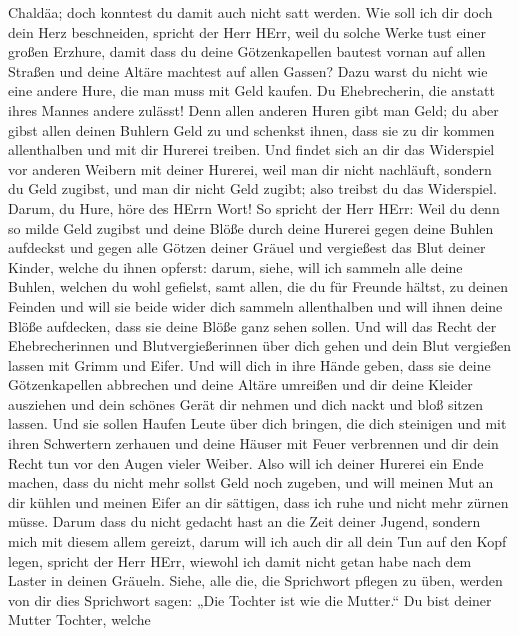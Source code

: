 Chaldäa; doch konntest du damit auch nicht satt werden. 
Wie soll ich dir doch dein Herz beschneiden, spricht der Herr HErr, weil
du solche Werke tust einer großen Erzhure,  damit dass du
deine Götzenkapellen bautest vornan auf allen Straßen und deine Altäre
machtest auf allen Gassen? Dazu warst du nicht wie eine andere Hure, die
man muss mit Geld kaufen.  Du Ehebrecherin, die anstatt
ihres Mannes andere zulässt!  Denn allen anderen Huren gibt
man Geld; du aber gibst allen deinen Buhlern Geld zu und schenkst ihnen,
dass sie zu dir kommen allenthalben und mit dir Hurerei treiben.
 Und findet sich an dir das Widerspiel vor anderen Weibern
mit deiner Hurerei, weil man dir nicht nachläuft, sondern du Geld
zugibst, und man dir nicht Geld zugibt; also treibst du das Widerspiel.
 Darum, du Hure, höre des HErrn Wort!  So
spricht der Herr HErr: Weil du denn so milde Geld zugibst und deine
Blöße durch deine Hurerei gegen deine Buhlen aufdeckst und gegen alle
Götzen deiner Gräuel und vergießest das Blut deiner Kinder, welche du
ihnen opferst:  darum, siehe, will ich sammeln alle deine
Buhlen, welchen du wohl gefielst, samt allen, die du für Freunde hältst,
zu deinen Feinden und will sie beide wider dich sammeln allenthalben und
will ihnen deine Blöße aufdecken, dass sie deine Blöße ganz sehen
sollen.  Und will das Recht der Ehebrecherinnen und
Blutvergießerinnen über dich gehen und dein Blut vergießen lassen mit
Grimm und Eifer.  Und will dich in ihre Hände geben, dass
sie deine Götzenkapellen abbrechen und deine Altäre umreißen und dir
deine Kleider ausziehen und dein schönes Gerät dir nehmen und dich nackt
und bloß sitzen lassen.  Und sie sollen Haufen Leute über
dich bringen, die dich steinigen und mit ihren Schwertern zerhauen
 und deine Häuser mit Feuer verbrennen und dir dein Recht
tun vor den Augen vieler Weiber. Also will ich deiner Hurerei ein Ende
machen, dass du nicht mehr sollst Geld noch zugeben,  und
will meinen Mut an dir kühlen und meinen Eifer an dir sättigen, dass ich
ruhe und nicht mehr zürnen müsse.  Darum dass du nicht
gedacht hast an die Zeit deiner Jugend, sondern mich mit diesem allem
gereizt, darum will ich auch dir all dein Tun auf den Kopf legen,
spricht der Herr HErr, wiewohl ich damit nicht getan habe nach dem
Laster in deinen Gräueln.  Siehe, alle die, die Sprichwort
pflegen zu üben, werden von dir dies Sprichwort sagen: „Die Tochter ist
wie die Mutter.``  Du bist deiner Mutter Tochter, welche
